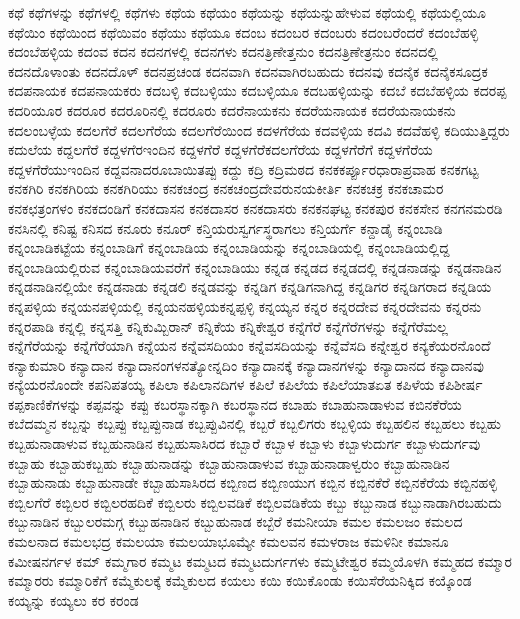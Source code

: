 {ಕಥೆ
ಕಥೆಗಳನ್ನು
ಕಥೆಗಳಲ್ಲಿ
ಕಥೆಗಳು
ಕಥೆಯ
ಕಥೆಯಂ
ಕಥೆಯನ್ನು
ಕಥೆಯನ್ನುಹೇಳುವ
ಕಥೆಯಲ್ಲಿ
ಕಥೆಯಲ್ಲಿಯೂ
ಕಥೆಯಿಂ
ಕಥೆಯಿಂದ
ಕಥೆಯಿವಂ
ಕಥೆಯು
ಕಥೆಯೂ
ಕದಂಬ
ಕದಂಬರ
ಕದಂಬರು
ಕದಂಬರೆಂದರೆ
ಕದಂಬೆಹಳ್ಳಿ
ಕದಂಬೆಹಳ್ಳಿಯ
ಕದಂವ
ಕದನ
ಕದನಗಳಲ್ಲಿ
ಕದನಗಳು
ಕದನತ್ರಿಣೇತ್ತನುಂ
ಕದನತ್ರಿಣೇತ್ರನುಂ
ಕದನದಲ್ಲಿ
ಕದನದೊಳಾಂತು
ಕದನದೊಳ್
ಕದನಪ್ರಚಂಡ
ಕದನವಾಗಿ
ಕದನವಾಗಿರಬಹುದು
ಕದನವು
ಕದನೈಕ
ಕದನೈಕಸೂದ್ರಕ
ಕದಪನಾಯಕ
ಕದಪನಾಯಕರು
ಕದಬಳ್ಳಿ
ಕದಬಳ್ಳಿಯು
ಕದಬಳ್ಳಿಯೂ
ಕದಬಹಳ್ಳಿಯನ್ನು
ಕದಬೆ
ಕದಬೆಹಳ್ಳಿಯ
ಕದರಪ್ಪ
ಕದರಿಯೂರ
ಕದರೂರ
ಕದರೂರಿನಲ್ಲಿ
ಕದರೂರು
ಕದರೆನಾಯಕನು
ಕದರೆಯನಾಯಕ
ಕದರೆಯನಾಯಕನು
ಕದಲಂಬಳ್ಳೆಯ
ಕದಲಗೆರೆ
ಕದಲಗೆರೆಯ
ಕದಲಗೆರೆಯಿಂದ
ಕದಳಗೆರೆಯ
ಕದವಳ್ಳಿಯ
ಕದವಿ
ಕದವೆಹಳ್ಳಿ
ಕದಿಯುತ್ತಿದ್ದರು
ಕದುಲೆಯ
ಕದ್ದಲಗೆರೆ
ಕದ್ದಳಗೆರಇಂದಿನ
ಕದ್ದಳಗೆರೆ
ಕದ್ದಳಗೆರೆಕದಲಗೆರೆಯ
ಕದ್ದಳಗೆರೆಗೆ
ಕದ್ದಳಗೆರೆಯ
ಕದ್ದಳಗೆರೆಯುಇಂದಿನ
ಕದ್ದವನಾದರೂಬಾಯಿತಪ್ಪು
ಕದ್ದು
ಕದ್ರಿ
ಕದ್ರಿಮಠದ
ಕನಕಕರ್ಪ್ಪೂರಧಾರಾಪ್ರವಾಹ
ಕನಕಗಟ್ಟ
ಕನಕಗಿರಿ
ಕನಕಗಿರಿಯ
ಕನಕಗಿರಿಯು
ಕನಕಚಂದ್ರ
ಕನಕಚಂದ್ರದೇವರುನಯಕೀರ್ತಿ
ಕನಕಚಕ್ರ
ಕನಕಚಾಮರ
ಕನಕಛತ್ರಂಗಳಂ
ಕನಕದಂಡಿಗೆ
ಕನಕದಾಸನ
ಕನಕದಾಸರ
ಕನಕದಾಸರು
ಕನಕನಘಟ್ಟ
ಕನಕಪುರ
ಕನಕಸೇನ
ಕನಗನಮರಡಿ
ಕನಸಿನಲ್ಲಿ
ಕನಿಷ್ಟ
ಕನಿಸದ
ಕನೂರು
ಕನೂರ್
ಕನ್ತಿಯರುಸ್ವರ್ಗಸ್ಥರಾಗಲು
ಕನ್ತಿಯರ್ಗೆ
ಕನ್ದಾಡೈ
ಕನ್ನಂಬಾಡಿ
ಕನ್ನಂಬಾಡಿಕಟ್ಟೆಯ
ಕನ್ನಂಬಾಡಿಗೆ
ಕನ್ನಂಬಾಡಿಯ
ಕನ್ನಂಬಾಡಿಯನ್ನು
ಕನ್ನಂಬಾಡಿಯಲ್ಲಿ
ಕನ್ನಂಬಾಡಿಯಲ್ಲಿದ್ದ
ಕನ್ನಂಬಾಡಿಯಲ್ಲಿರುವ
ಕನ್ನಂಬಾಡಿಯವರೆಗೆ
ಕನ್ನಂಬಾಡಿಯು
ಕನ್ನಡ
ಕನ್ನಡದ
ಕನ್ನಡದಲ್ಲಿ
ಕನ್ನಡನಾಡನ್ನು
ಕನ್ನಡನಾಡಿನ
ಕನ್ನಡನಾಡಿನಲ್ಲಿಯೇ
ಕನ್ನಡನಾಡು
ಕನ್ನಡಲಿ
ಕನ್ನಡವನ್ನು
ಕನ್ನಡಿಗ
ಕನ್ನಡಿಗನಾಗಿದ್ದ
ಕನ್ನಡಿಗರ
ಕನ್ನಡಿಗರಾದ
ಕನ್ನಡಿಯ
ಕನ್ನಪಳ್ಳಿಯ
ಕನ್ನಯನಪಳ್ಳಿಯಲ್ಲಿ
ಕನ್ನಯನಹಳ್ಳಿಯಕನ್ನಪ್ಪಳ್ಳಿ
ಕನ್ನಯ್ಯನ
ಕನ್ನರ
ಕನ್ನರದೇವ
ಕನ್ನರದೇವನು
ಕನ್ನರನು
ಕನ್ನರಪಾಡಿ
ಕನ್ನಲ್ಲಿ
ಕನ್ನಸತ್ತಿ
ಕನ್ನಿಕುಮ್ಬಿರಾನ್
ಕನ್ನಿಕೆಯ
ಕನ್ನಿಕೇಶ್ವರ
ಕನ್ನೆಗೆರೆ
ಕನ್ನೆಗೆರೆಗಳನ್ನು
ಕನ್ನೆಗೆರೆಮಲ್ಲ
ಕನ್ನೆಗೆರೆಯನ್ನು
ಕನ್ನೆಗೆರೆಯಾಗಿ
ಕನ್ನೆಯನ
ಕನ್ನೆವಸದಿಯಂ
ಕನ್ನೆವಸದಿಯನ್ನು
ಕನ್ನೆವೆಸದಿ
ಕನ್ನೇಶ್ವರ
ಕನ್ಯಕೆಯರನೊಂದೆ
ಕನ್ಯಾಕುಮಾರಿ
ಕನ್ಯಾದಾನ
ಕನ್ಯಾದಾನಂಗಳನತ್ಯೋನ್ನದಿಂ
ಕನ್ಯಾದಾನಕ್ಕೆ
ಕನ್ಯಾದಾನಗಳನ್ನು
ಕನ್ಯಾದಾನದ
ಕನ್ಯಾದಾನವು
ಕನ್ಯೆಯರನೊಂದೇ
ಕಪನಿಪತಯ್ಯ
ಕಪಿಲಾ
ಕಪಿಲಾನದಿಗಳ
ಕಪಿಲೆ
ಕಪಿಲೆಯ
ಕಪಿಲೆಯಾತಏತ
ಕಪಿಳೆಯ
ಕಪಿಶೀರ್ಷ
ಕಪ್ಪಕಾಣಿಕೆಗಳನ್ನು
ಕಪ್ಪವನ್ನು
ಕಪ್ಪು
ಕಬರಸ್ಥಾನಕ್ಕಾಗಿ
ಕಬರಸ್ಥಾನದ
ಕಬಾಹು
ಕಬಾಹುನಾಡಾಳುವ
ಕಬಿನಕೆರೆಯ
ಕಬೆದಮ್ಮನ
ಕಬ್ಬನ್ನು
ಕಬ್ಬಪ್ಪು
ಕಬ್ಬಪ್ಪುನಾಡ
ಕಬ್ಬಪ್ಪುವಿನಲ್ಲಿ
ಕಬ್ಬರೆ
ಕಬ್ಬಲಿಗರು
ಕಬ್ಬಳ್ಳಿಯ
ಕಬ್ಬಹಲಿನ
ಕಬ್ಬಹಲು
ಕಬ್ಬಹು
ಕಬ್ಬಹುನಾಡಾಳುವ
ಕಬ್ಬಹುನಾಡಿನ
ಕಬ್ಬಹುಸಾಸಿರದ
ಕಬ್ಬಾರೆ
ಕಬ್ಬಾಳ
ಕಬ್ಬಾಳು
ಕಬ್ಬಾಳುದುರ್ಗ
ಕಬ್ಬಾಳುದುರ್ಗವು
ಕಬ್ಬಾಹು
ಕಬ್ಬಾಹುಕಬ್ಬಹು
ಕಬ್ಬಾಹುನಾಡನ್ನು
ಕಬ್ಬಾಹುನಾಡಾಳುವ
ಕಬ್ಬಾಹುನಾಡಾಳ್ವರುಂ
ಕಬ್ಬಾಹುನಾಡಿನ
ಕಬ್ಬಾಹುನಾಡು
ಕಬ್ಬಾಹುನಾಡೇ
ಕಬ್ಬಾಹುಸಾಸಿರದ
ಕಬ್ಬಿಣದ
ಕಬ್ಬಿಣಯುಗ
ಕಬ್ಬಿನ
ಕಬ್ಬಿನಕೆರೆ
ಕಬ್ಬಿನಕೆರೆಯ
ಕಬ್ಬಿನಹಳ್ಳಿ
ಕಬ್ಬಿಲಗೆರೆ
ಕಬ್ಬಿಲರ
ಕಬ್ಬಿಲರಹದಿಕೆ
ಕಬ್ಬಿಲರು
ಕಬ್ಬಿಲವಡಿಕೆ
ಕಬ್ಬಿಲವಡಿಕೆಯ
ಕಬ್ಬು
ಕಬ್ಬುನಾಡ
ಕಬ್ಬುನಾಡಾಗಿರಬಹುದು
ಕಬ್ಬುನಾಡಿನ
ಕಬ್ಬುಲರಮಗ್ಗ
ಕಬ್ಬುಹನಾಡಿನ
ಕಬ್ಬುಹುನಾಡ
ಕಬ್ಬೆರೆ
ಕಮನೀಯಾ
ಕಮಲ
ಕಮಲಜಂ
ಕಮಲದ
ಕಮಲನಾದ
ಕಮಲಭದ್ರ
ಕಮಲಯಾ
ಕಮಲಯಾಭೂಮ್ಯೇ
ಕಮಲವನ
ಕಮಳರಾಜ
ಕಮಳಿನೀ
ಕಮಾನೂ
ಕಮೀಷನರ್ಗಳ
ಕಮ್
ಕಮ್ಮಗಾರ
ಕಮ್ಮಟ
ಕಮ್ಮಟದ
ಕಮ್ಮಟದುರ್ಗಗಳು
ಕಮ್ಮಟೇಶ್ವರ
ಕಮ್ಮಯೊಳಗಿ
ಕಮ್ಮಹದ
ಕಮ್ಮಾರ
ಕಮ್ಮಾರರು
ಕಮ್ಮಾರಿಕೆಗೆ
ಕಮ್ಮೆಕುಲಕ್ಕೆ
ಕಮ್ಮೆಕುಲದ
ಕಯಲು
ಕಯಿ
ಕಯಿಕೊಂಡು
ಕಯಿಸೆರೆಯನಿಕ್ಕಿದ
ಕಯ್ಕೊಂಡ
ಕಯ್ಯನ್ನು
ಕಯ್ಯಲು
ಕರ
ಕರಂಡ
}
